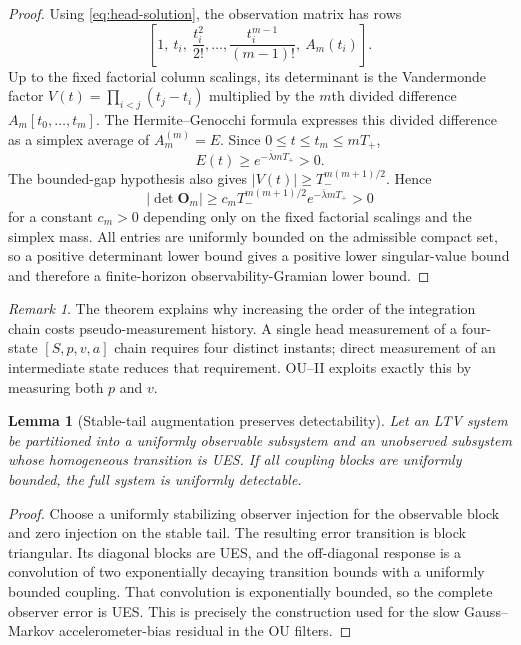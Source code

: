 \documentclass[conference]{IEEEtran}
\DeclareRobustCommand{\mat}[1]{\bm{#1}}
\newcommand{\abs}[1]{\left|#1\right|}
\newtheorem{lemma}{Lemma}
\theoremstyle{remark}
\newtheorem{remark}{Remark}
\begin{document}
\begin{proof}
Using \eqref{eq:head-solution}, the observation matrix has rows
\begin{equation}
 \left[1,\ t_i,\ \frac{t_i^2}{2!},\ldots,
 \frac{t_i^{m-1}}{(m-1)!},\ A_m(t_i)\right].
 \label{eq:general-observation-matrix}
\end{equation}
Up to the fixed factorial column scalings, its determinant is the Vandermonde
factor
$V(t)=\prod_{i<j}(t_j-t_i)$ multiplied by the $m$th divided difference
$A_m[t_0,\ldots,t_m]$.  The Hermite--Genocchi formula expresses this divided
difference as a simplex average of $A_m^{(m)}=E$.  Since
$0\le t\le t_m\le mT_+$,
\begin{equation}
 E(t)\ge e^{-\bar\lambda mT_+}>0.
\end{equation}
The bounded-gap hypothesis also gives
$\abs{V(t)}\ge T_-^{m(m+1)/2}$.  Hence
\begin{equation}
 \abs{\det\mat O_m}
 \ge c_m T_-^{m(m+1)/2}e^{-\bar\lambda mT_+}>0
 \label{eq:general-det-bound}
\end{equation}
for a constant $c_m>0$ depending only on the fixed factorial scalings and the
simplex mass.  All entries are uniformly bounded on the admissible compact set,
so a positive determinant lower bound gives a positive lower singular-value
bound and therefore a finite-horizon observability-Gramian lower bound.
\end{proof}

\begin{remark}
The theorem explains why increasing the order of the integration chain costs
pseudo-measurement history.  A single head measurement of a four-state
$[S,p,v,a]$ chain requires four distinct instants; direct measurement of an
intermediate state reduces that requirement.  OU--II exploits exactly this by
measuring both $p$ and $v$.
\end{remark}

\begin{lemma}[Stable-tail augmentation preserves detectability]
\label{lem:stable-tail}
Let an LTV system be partitioned into a uniformly observable subsystem and an
unobserved subsystem whose homogeneous transition is UES.  If all coupling
blocks are uniformly bounded, the full system is uniformly detectable.
\end{lemma}

\begin{proof}
Choose a uniformly stabilizing observer injection for the observable block and
zero injection on the stable tail.  The resulting error transition is block
triangular.  Its diagonal blocks are UES, and the off-diagonal response is a
convolution of two exponentially decaying transition bounds with a uniformly
bounded coupling.  That convolution is exponentially bounded, so the complete
observer error is UES.  This is precisely the construction used for the slow
Gauss--Markov accelerometer-bias residual in the OU filters.
\end{proof}
\end{document}
